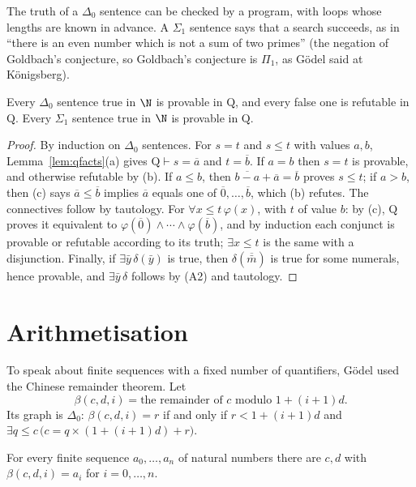 The truth of a $\Delta_0$ sentence can be checked by a program, with loops whose lengths are known in advance. A $\Sigma_1$ sentence says that a search succeeds, as in ``there is an even number which is not a sum of two primes'' (the negation of Goldbach's conjecture, so Goldbach's conjecture is $\Pi_1$, as Gödel said at Königsberg).

\begin{theorem}\label{thm:sigma1complete}
Every $\Delta_0$ sentence true in $\N$ is provable in $\mathrm Q$, and every false one is refutable in $\mathrm Q$. Every $\Sigma_1$ sentence true in $\N$ is provable in $\mathrm Q$.
\end{theorem}

\begin{proof}
By induction on $\Delta_0$ sentences. For $s=t$ and $s\le t$ with values $a,b$, Lemma~\ref{lem:qfacts}(a) gives $\mathrm Q\vdash s=\overline a$ and $t=\overline b$. If $a=b$ then $s=t$ is provable, and otherwise refutable by (b). If $a\le b$, then $\overline{b-a}+\overline a=\overline b$ proves $s\le t$; if $a>b$, then (c) says $\overline a\le\overline b$ implies $\overline a$ equals one of $\overline0,\dots,\overline b$, which (b) refutes. The connectives follow by tautology. For $\forall x\le t\,\varphi(x)$, with $t$ of value $b$: by (c), $\mathrm Q$ proves it equivalent to $\varphi(\overline0)\land\cdots\land\varphi(\overline b)$, and by induction each conjunct is provable or refutable according to its truth; $\exists x\le t$ is the same with a disjunction. Finally, if $\exists\bar y\,\delta(\bar y)$ is true, then $\delta(\overline{\bar m})$ is true for some numerals, hence provable, and $\exists\bar y\,\delta$ follows by (A2) and tautology.
\end{proof}

\section{Arithmetisation}\label{sec:arithmetisation}

To speak about finite sequences with a fixed number of quantifiers, Gödel used the Chinese remainder theorem. Let
\[
\beta(c,d,i)=\text{the remainder of }c\text{ modulo }1+(i+1)d.
\]
Its graph is $\Delta_0$: $\beta(c,d,i)=r$ if and only if $r<1+(i+1)d$ and $\exists q\le c\,\bigl(c=q\times(1+(i+1)d)+r\bigr)$.

\begin{lemma}\label{lem:beta}
For every finite sequence $a_0,\dots,a_n$ of natural numbers there are $c,d$ with $\beta(c,d,i)=a_i$ for $i=0,\dots,n$.
\end{lemma}

